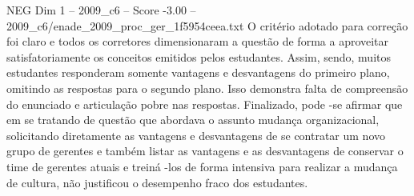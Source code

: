 \begin{textsample}{NEG Dim 1 – 2009\_c6 – Score -3.00 – 2009\_c6/enade\_2009\_proc\_ger\_1f5954ceea.txt}
O critério adotado para correção foi claro e todos os corretores dimensionaram a questão de forma a aproveitar satisfatoriamente os conceitos emitidos pelos estudantes.
Assim, sendo, muitos estudantes responderam somente vantagens e desvantagens do primeiro plano, omitindo as respostas para o segundo plano.
Isso demonstra falta de compreensão do enunciado e articulação pobre nas respostas.
Finalizado, pode -se afirmar que em se tratando de questão que abordava o assunto mudança organizacional, solicitando diretamente as vantagens e desvantagens de se contratar um novo grupo de gerentes e também listar as vantagens e as desvantagens de conservar o time de gerentes atuais e treiná -los de forma intensiva para realizar a mudança de cultura, não justificou o desempenho fraco dos estudantes.

\end{textsample}
